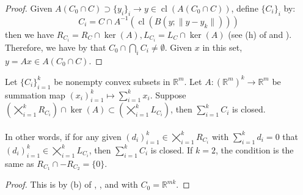 \begin{proof}
	Given $A(C_0\cap C)\supset\{y_i\}_{i}\to y\in \operatorname{cl}(A(C_0\cap C))$, define $\{C_i\}_i$ by:
	\[
		C_i=C\cap A^{-1}\left(\operatorname{cl}\left(B(y;\|y-y_k\|) \right)\right)
	\]
	then we have $R_{C_i}=R_C\cap \operatorname{ker}(A),L_{C_i}=L_C\cap \operatorname{ker}(A)$ (see (h) of  and ). Therefore, we have by  that $C_0\cap \bigcap_iC_i\neq\emptyset$. Given $x$ in this set, $y=Ax\in A(C_0\cap C)$.
\end{proof}

\begin{coro}\label{coro:014-closed-sum}
	Let $\{C_i\}_{i=1}^k$ be nonempty convex subsets in $\mathbb{R}^m$. Let $A:(\mathbb{R}^{m})^k\to \mathbb{R}^m$ be summation map $(x_i)_{i=1}^k\mapsto \sum_{i=1}^kx_i$. Suppose $\left(\bigtimes_{i=1}^kR_{C_i}\right)\cap\operatorname{ker}(A)\subset \left(\bigtimes_{i=1}^kL_{C_i}\right)$, then $\sum_{i=1}^kC_i$ is closed.
\end{coro}

\paragraph{}In other words, if for any given $(d_i)_{i=1}^k\in\bigtimes_{i=1}^kR_{C_i}$ with $\sum_{i=1}^kd_i=0$ that $(d_i)_{i=1}^k\in\bigtimes_{i=1}^kL_{C_i}$, then $\sum_{i=1}^kC_i$ is closed. If $k=2$, the condition is the same as $R_{C_1}\cap -R_{C_2}=\{0\}$.

\begin{proof}
	This is by (b) of , , and  with $C_0=\mathbb{R}^{mk}$.
\end{proof}

